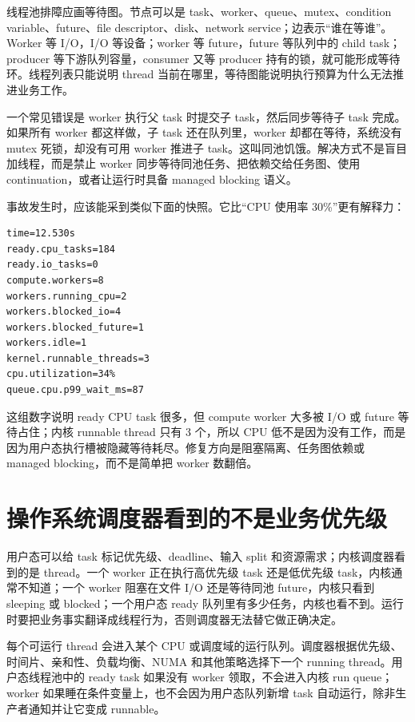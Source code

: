 线程池排障应画等待图。节点可以是 task、worker、queue、mutex、condition variable、future、file descriptor、disk、network service；边表示“谁在等谁”。Worker 等 I/O，I/O 等设备；worker 等 future，future 等队列中的 child task；producer 等下游队列容量，consumer 又等 producer 持有的锁，就可能形成等待环。线程列表只能说明 thread 当前在哪里，等待图能说明执行预算为什么无法推进业务工作。

一个常见错误是 worker 执行父 task 时提交子 task，然后同步等待子 task 完成。如果所有 worker 都这样做，子 task 还在队列里，worker 却都在等待，系统没有 mutex 死锁，却没有可用 worker 推进子 task。这叫同池饥饿。解决方式不是盲目加线程，而是禁止 worker 同步等待同池任务、把依赖交给任务图、使用 continuation，或者让运行时具备 managed blocking 语义。

事故发生时，应该能采到类似下面的快照。它比“CPU 使用率 30\%”更有解释力：

\begin{lstlisting}[numbers=none,caption={阻塞污染事故的状态样本}]
time=12.530s
ready.cpu_tasks=184
ready.io_tasks=0
compute.workers=8
workers.running_cpu=2
workers.blocked_io=4
workers.blocked_future=1
workers.idle=1
kernel.runnable_threads=3
cpu.utilization=34%
queue.cpu.p99_wait_ms=87
\end{lstlisting}

这组数字说明 ready CPU task 很多，但 compute worker 大多被 I/O 或 future 等待占住；内核 runnable thread 只有 3 个，所以 CPU 低不是因为没有工作，而是因为用户态执行槽被隐藏等待耗尽。修复方向是阻塞隔离、任务图依赖或 managed blocking，而不是简单把 worker 数翻倍。

\section{操作系统调度器看到的不是业务优先级}

用户态可以给 task 标记优先级、deadline、输入 split 和资源需求；内核调度器看到的是 thread。一个 worker 正在执行高优先级 task 还是低优先级 task，内核通常不知道；一个 worker 阻塞在文件 I/O 还是等待同池 future，内核只看到 sleeping 或 blocked；一个用户态 ready 队列里有多少任务，内核也看不到。运行时要把业务事实翻译成线程行为，否则调度器无法替它做正确决定。

每个可运行 thread 会进入某个 CPU 或调度域的运行队列。调度器根据优先级、时间片、亲和性、负载均衡、NUMA 和其他策略选择下一个 running thread。用户态线程池中的 ready task 如果没有 worker 领取，不会进入内核 run queue；worker 如果睡在条件变量上，也不会因为用户态队列新增 task 自动运行，除非生产者通知并让它变成 runnable。

